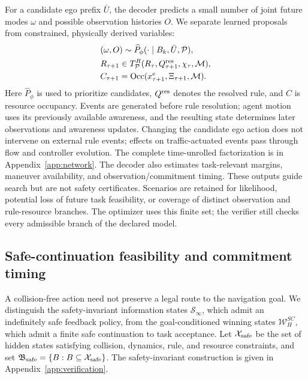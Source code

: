 \documentclass[letterpaper]{article} %
\begin{document}
For a candidate ego prefix $\bar U$, the decoder predicts a small number of joint future modes $\omega$ and possible observation histories $O$. We separate learned proposals from constrained, physically derived variables:
\begin{equation}
\begin{aligned}
&(\omega,O)\sim\widehat P_\phi(\cdot\mid B_k,\bar U,\mathcal P),\\
& R_{\tau+1}\in T_{\mathcal P}^{R}(R_\tau,Q_{\tau+1}^{\rm res},\chi_\tau,\mathcal M),\\
& C_{\tau+1}=\operatorname{Occ}(x_{\tau+1}^e,\Xi_{\tau+1},\mathcal M).
\end{aligned}
\label{eq:joint-factor}
\end{equation}
Here $\widehat P_\phi$ is used to prioritize candidates, $Q^{\rm res}$ denotes the resolved rule, and $C$ is resource occupancy. Events are generated before rule resolution; agent motion uses its previously available awareness, and the resulting state determines later observations and awareness updates. Changing the candidate ego action does not intervene on external rule events; effects on traffic-actuated events pass through flow and controller evolution. The complete time-unrolled factorization is in Appendix~\ref{app:network}.
The decoder also estimates task-relevant margins, maneuver availability, and observation/commitment timing. These outputs guide search but are not safety certificates. Scenarios are retained for likelihood, potential loss of future task feasibility, or coverage of distinct observation and rule-resource branches. The optimizer uses this finite set; the verifier still checks every admissible branch of the declared model.

\subsection{Safe-continuation feasibility and commitment timing}
\label{sec:viability}
A collision-free action need not preserve a legal route to the navigation goal. We distinguish the safety-invariant information states $\mathcal S_\infty$, which admit an indefinitely safe feedback policy, from the goal-conditioned winning states $\mathcal W_H^{SC}$, which admit a finite safe continuation to task acceptance. Let $\mathcal X_{\rm safe}$ be the set of hidden states satisfying collision, dynamics, rule, and resource constraints, and set $\mathfrak B_{\rm safe}=\{B:B\subseteq\mathcal X_{\rm safe}\}$. The safety-invariant construction is given in Appendix~\ref{app:verification}.
\end{document}
